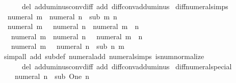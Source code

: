 \begin{isabellebody}
\ \ \ \ \ \ del{\isacharcolon}{\kern0pt}\ add{\isacharunderscore}{\kern0pt}uminus{\isacharunderscore}{\kern0pt}conv{\isacharunderscore}{\kern0pt}diff\ add{\isacharcolon}{\kern0pt}\ diff{\isacharunderscore}{\kern0pt}conv{\isacharunderscore}{\kern0pt}add{\isacharunderscore}{\kern0pt}uminus{\isacharparenright}{\kern0pt}%
\endisatagproof
{\isafoldproof}%
%
\isadelimproof
\isanewline
%
\endisadelimproof
\isanewline
{}\isamarkupfalse%
\ diff{\isacharunderscore}{\kern0pt}numeral{\isacharunderscore}{\kern0pt}simps{\isacharcolon}{\kern0pt}\isanewline
\ \ {\isachardoublequoteopen}numeral\ m\ {\isacharminus}{\kern0pt}\ numeral\ n\ {\isacharequal}{\kern0pt}\ sub\ m\ n{\isachardoublequoteclose}\isanewline
\ \ {\isachardoublequoteopen}numeral\ m\ {\isacharminus}{\kern0pt}\ {\isacharminus}{\kern0pt}\ numeral\ n\ {\isacharequal}{\kern0pt}\ numeral\ {\isacharparenleft}{\kern0pt}m\ {\isacharplus}{\kern0pt}\ n{\isacharparenright}{\kern0pt}{\isachardoublequoteclose}\isanewline
\ \ {\isachardoublequoteopen}{\isacharminus}{\kern0pt}\ numeral\ m\ {\isacharminus}{\kern0pt}\ numeral\ n\ {\isacharequal}{\kern0pt}\ {\isacharminus}{\kern0pt}\ numeral\ {\isacharparenleft}{\kern0pt}m\ {\isacharplus}{\kern0pt}\ n{\isacharparenright}{\kern0pt}{\isachardoublequoteclose}\isanewline
\ \ {\isachardoublequoteopen}{\isacharminus}{\kern0pt}\ numeral\ m\ {\isacharminus}{\kern0pt}\ {\isacharminus}{\kern0pt}\ numeral\ n\ {\isacharequal}{\kern0pt}\ sub\ n\ m{\isachardoublequoteclose}\isanewline
%
\isadelimproof
\ \ %
\endisadelimproof
%
\isatagproof
{}\isamarkupfalse%
\ {\isacharparenleft}{\kern0pt}simp{\isacharunderscore}{\kern0pt}all\ add{\isacharcolon}{\kern0pt}\ sub{\isacharunderscore}{\kern0pt}def\ numeral{\isacharunderscore}{\kern0pt}add\ numeral{\isachardot}{\kern0pt}simps\ is{\isacharunderscore}{\kern0pt}num{\isacharunderscore}{\kern0pt}normalize\isanewline
\ \ \ \ \ \ del{\isacharcolon}{\kern0pt}\ add{\isacharunderscore}{\kern0pt}uminus{\isacharunderscore}{\kern0pt}conv{\isacharunderscore}{\kern0pt}diff\ add{\isacharcolon}{\kern0pt}\ diff{\isacharunderscore}{\kern0pt}conv{\isacharunderscore}{\kern0pt}add{\isacharunderscore}{\kern0pt}uminus{\isacharparenright}{\kern0pt}%
\endisatagproof
{\isafoldproof}%
%
\isadelimproof
\isanewline
%
\endisadelimproof
\isanewline
{}\isamarkupfalse%
\ diff{\isacharunderscore}{\kern0pt}numeral{\isacharunderscore}{\kern0pt}special{\isacharcolon}{\kern0pt}\isanewline
\ \ {\isachardoublequoteopen}{}\ {\isacharminus}{\kern0pt}\ numeral\ n\ {\isacharequal}{\kern0pt}\ sub\ One\ n{\isachardoublequoteclose}\isanewline

\end{isabellebody}
